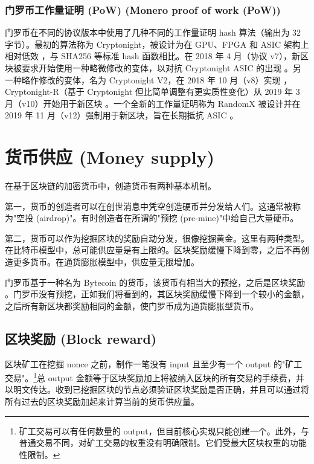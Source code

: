 \subsubsection*{门罗币工作量证明 (PoW) (Monero proof of work (PoW))}

门罗币在不同的协议版本中使用了几种不同的工作量证明 hash 算法（输出为 32 字节）。最初的算法称为 Cryptonight，被设计为在 GPU、FPGA 和 ASIC 架构上相对低效 \cite{CryptoNight}，与 SHA256 等标准 hash 函数相比。在 2018 年 4 月（协议 v7），新区块被要求开始使用一种略微修改的变体，以对抗 Cryptonight ASIC 的出现 \cite{cryptonight7}。另一种略作修改的变体，名为 Cryptonight V2，在 2018 年 10 月（v8）实现 \cite{berylliumbullet-v8}，Cryptonight-R（基于 Cryptonight 但比简单调整有更实质性变化）从 2019 年 3 月（v10）开始用于新区块 \cite{boronbutterfly-v10}。一个全新的工作量证明称为 RandomX \cite{randomx-pr-5549} 被设计并在 2019 年 11 月（v12）强制用于新区块，旨在长期抵抗 ASIC \cite{randomx}。



\section{货币供应 (Money supply)}
\label{sec:money-supply}

在基于区块链的加密货币中，创造货币有两种基本机制。

第一，货币的创造者可以在创世消息中凭空创造硬币并分发给人们。这通常被称为"空投 (airdrop)"。有时创造者在所谓的"预挖 (pre-mine)"中给自己大量硬币。\cite{premine-description}

第二，货币可以作为挖掘区块的奖励自动分发，很像挖掘黄金。这里有两种类型。在比特币模型中，总可能供应量是有上限的。区块奖励缓慢下降到零，之后不再创造更多货币。在通货膨胀模型中，供应量无限增加。

门罗币基于一种名为 Bytecoin 的货币，该货币有相当大的预挖，之后是区块奖励 \cite{monero-history}。门罗币没有预挖，正如我们将看到的，其区块奖励缓慢下降到一个较小的金额，之后所有新区块都奖励相同的金额，使门罗币成为通货膨胀型货币。


\subsection{区块奖励 (Block reward)}
\label{subsec:block-reward} %

区块矿工在挖掘 nonce 之前，制作一笔没有 input 且至少有一个 output 的"矿工交易"。\footnote{矿工交易可以有任何数量的 output，但目前核心实现只能创建一个。此外，与普通交易不同，对矿工交易的权重没有明确限制。它们受最大区块权重的功能性限制。}总 output 金额等于区块奖励加上将被纳入区块的所有交易的手续费，并以明文传达。收到已挖掘区块的节点必须验证区块奖励是否正确，并且可以通过将所有过去的区块奖励加起来计算当前的货币供应量。

